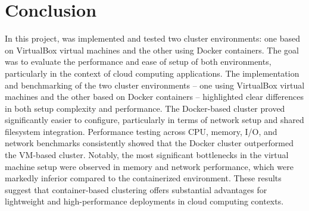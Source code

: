 \section{Conclusion}

In this project, was implemented and tested two cluster environments: one based on VirtualBox virtual machines and the other using Docker containers. The goal was to evaluate the performance and ease of setup of both environments, particularly in the context of cloud computing applications. The implementation and benchmarking of the two cluster environments -- one using VirtualBox virtual machines and the other based on Docker containers -- highlighted clear differences in both setup complexity and performance. The Docker-based cluster proved significantly easier to configure, particularly in terms of network setup and shared filesystem integration. Performance testing across CPU, memory, I/O, and network benchmarks consistently showed that the Docker cluster outperformed the VM-based cluster. Notably, the most significant bottlenecks in the virtual machine setup were observed in memory and network performance, which were markedly inferior compared to the containerized environment. These results suggest that container-based clustering offers substantial advantages for lightweight and high-performance deployments in cloud computing contexts.

